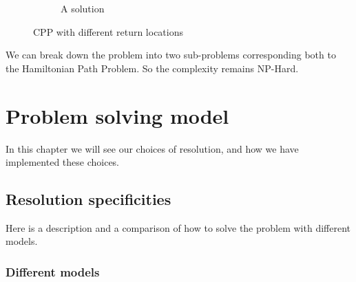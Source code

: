 \documentclass[12pt, a4paper, twoside]{memoir}
\begin{document}
{\begin{figure}[H]
\begin{subfigure}{.5\textwidth}
			\caption{A solution}
		\end{subfigure}
		\caption{CPP with different return locations}
		\label{fig:CPP with different return locations}
	\end{figure}
	
	We can break down the problem into two sub-problems corresponding both to the Hamiltonian Path Problem. So the complexity remains NP-Hard.
	
	\cleardoublepage
	\chapter{Problem solving model}
	
	In this chapter we will see our choices of resolution, and how we have implemented these choices. 
	
	\section{Resolution specificities}
	
	Here is a description and a comparison of how to solve the problem with different models. 
	
	\subsection{Different models}
	
}
\end{document}
